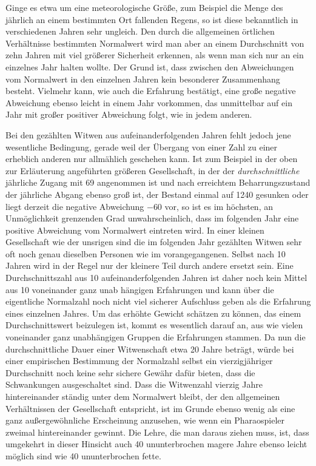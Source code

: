 Ginge es etwa um eine meteorologische Größe, zum Beispiel die Menge des jährlich an einem bestimmten Ort fallenden Regens, so ist diese bekanntlich in verschiedenen Jahren sehr ungleich. Den durch die allgemeinen örtlichen Verhältnisse bestimmten Normalwert wird man aber an einem Durchschnitt von zehn Jahren mit viel größerer Sicherheit erkennen, als wenn man sich nur an ein einzelnes Jahr halten wollte. Der Grund ist, dass zwischen den Abweichungen vom Normalwert in den einzelnen Jahren kein besonderer Zusammenhang besteht. Vielmehr kann, wie auch die Erfahrung bestätigt, eine große negative Abweichung ebenso leicht in einem Jahr vorkommen, das unmittelbar auf ein Jahr mit großer positiver Abweichung folgt, wie in jedem anderen.

Bei den gezählten Witwen aus aufeinanderfolgenden Jahren fehlt jedoch jene wesentliche Bedingung, gerade weil der Übergang von einer Zahl zu einer erheblich anderen nur allmählich geschehen kann. Ist zum Beispiel in der oben zur Erläuterung angeführten größeren Gesellschaft, in der der \textit{durchschnittliche} jährliche Zugang mit 69 angenommen ist und nach erreichtem Beharrungszustand der jährliche Abgang ebenso groß ist, der Bestand einmal auf 1240 gesunken oder liegt derzeit die negative Abweichung \(-60\) vor, so ist es im höchsten, an Unmöglichkeit grenzenden Grad unwahrscheinlich, dass im folgenden Jahr eine positive Abweichung vom Normalwert eintreten wird. In einer kleinen Gesellschaft wie der unsrigen sind die im folgenden Jahr gezählten Witwen sehr oft noch genau dieselben Personen wie im vorangegangenen. Selbst nach 10 Jahren wird in der Regel nur der kleinere Teil durch andere ersetzt sein. Eine Durchschnittszahl aus 10 aufeinanderfolgenden Jahren ist daher noch kein Mittel aus 10 voneinander ganz unab%
%
hängigen Erfahrungen und kann über die eigentliche Normalzahl noch nicht viel sicherer Aufschluss geben als die Erfahrung eines einzelnen Jahres. Um das erhöhte Gewicht schätzen zu können, das einem Durchschnittswert beizulegen ist, kommt es wesentlich darauf an, aus wie vielen voneinander ganz unabhängigen Gruppen die Erfahrungen stammen. Da nun die durchschnittliche Dauer einer Witwenschaft etwa 20 Jahre beträgt, würde bei einer empirischen Bestimmung der Normalzahl selbst ein vierzigjähriger Durchschnitt noch keine sehr sichere Gewähr dafür bieten, dass die Schwankungen ausgeschaltet sind. Dass die Witwenzahl vierzig Jahre hintereinander ständig unter dem Normalwert bleibt, der den allgemeinen Verhältnissen der Gesellschaft entspricht, ist im Grunde ebenso wenig als eine ganz außergewöhnliche Erscheinung anzusehen, wie wenn ein Pharaospieler zweimal hintereinander gewinnt. Die Lehre, die man daraus ziehen muss, ist, dass umgekehrt in dieser Hinsicht auch 40 ununterbrochen magere Jahre ebenso leicht möglich sind wie 40 ununterbrochen fette.

